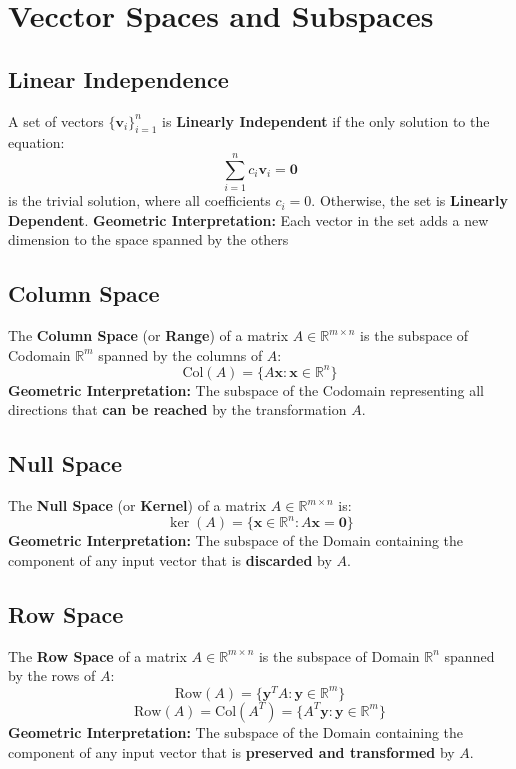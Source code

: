 \documentclass{article}
\begin{document}
\newpage
\section{Vecctor Spaces and Subspaces}

\subsection{Linear Independence}
A set of vectors $\{\mathbf{v}_i\}_{i=1}^n$ is \textbf{Linearly Independent} if the only solution to the equation:
\[
    \sum_{i=1}^{n} c_i \mathbf{v}_i = \mathbf{0}
\]
is the trivial solution, where all coefficients $c_i = 0$. Otherwise, the set is \textbf{Linearly Dependent}.
\newline
\textbf{Geometric Interpretation:} Each vector in the set adds a new dimension to the space spanned by the others

\subsection{Column Space}
The \textbf{Column Space} (or \textbf{Range}) of a matrix $A \in \mathbb{R}^{m \times n}$ is the subspace of Codomain $\mathbb{R}^m$ spanned by the columns of $A$:
\[
    \text{Col}(A) = \{ A\mathbf{x} : \mathbf{x} \in \mathbb{R}^n \}
\]
\textbf{Geometric Interpretation:} The subspace of the Codomain representing all directions that \textbf{can be reached} by the transformation $A$.

\subsection{Null Space}
The \textbf{Null Space} (or \textbf{Kernel}) of a matrix $A \in \mathbb{R}^{m \times n}$ is:
\[
    \ker(A) = \{ \mathbf{x} \in \mathbb{R}^n : A\mathbf{x} = \mathbf{0} \}
\]
\textbf{Geometric Interpretation:} The subspace of the Domain containing the component of any input vector that is \textbf{discarded} by $A$.

\subsection{Row Space}
The \textbf{Row Space} of a matrix $A \in \mathbb{R}^{m \times n}$ is the subspace of Domain $\mathbb{R}^n$ spanned by the rows of $A$:
\[
    \text{Row}(A) = \{ \mathbf{y}^T A : \mathbf{y} \in \mathbb{R}^m \}
\]
\[
    \text{Row}(A) = \text{Col}(A^T) = \{ A^T\mathbf{y} : \mathbf{y} \in \mathbb{R}^m \}
\]
\textbf{Geometric Interpretation:} The subspace of the Domain containing the component of any input vector that is \textbf{preserved and transformed} by $A$.
\end{document}
